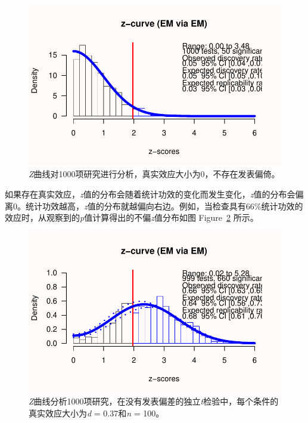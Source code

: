 \documentclass[
  letterpaper,
  DIV=11,
  numbers=noendperiod]{scrreprt}
\begin{document}
\begin{figure}

{\centering \includegraphics[width=1\textwidth,height=\textheight]{12-bias_files/figure-pdf/fig-zcurveunbiasednull-1.pdf}

}

\caption{\label{fig-zcurveunbiasednull}\emph{Z}曲线对1000项研究进行分析，真实效应大小为0，不存在发表偏倚。}

\end{figure}

如果存在真实效应，\emph{z}值的分布会随着统计功效的变化而发生变化，\emph{z}值的分布会偏离0。统计功效越高，\emph{z}值的分布就越偏向右边。例如，当检查具有66\%统计功效的效应时，从观察到的\emph{p}值计算得出的不偏\emph{z}值分布如图
Figure~\ref{fig-zcurveunbiasedalternative} 所示。

\begin{figure}

{\centering \includegraphics[width=1\textwidth,height=\textheight]{12-bias_files/figure-pdf/fig-zcurveunbiasedalternative-1.pdf}

}

\caption{\label{fig-zcurveunbiasedalternative}\emph{Z}曲线分析1000项研究，在没有发表偏差的独立\emph{t}检验中，每个条件的真实效应大小为\emph{d}
= 0.37和\emph{n} = 100。}

\end{figure}
\end{document}
